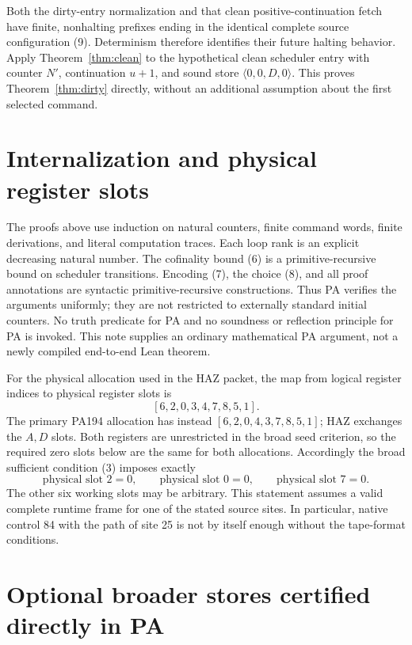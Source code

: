 \documentclass[11pt]{article}
\begin{document}
Both the dirty-entry normalization and that clean positive-continuation
fetch have finite, nonhalting prefixes ending in the identical complete
source configuration (9). Determinism therefore identifies their future
halting behavior. Apply Theorem~\ref{thm:clean} to the hypothetical clean
scheduler entry with counter $N'$, continuation $u+1$, and sound store
$\langle0,0,D,0\rangle$. This proves Theorem~\ref{thm:dirty} directly,
without an additional assumption about the first selected command.

\section{Internalization and physical register slots}

The proofs above use induction on natural counters, finite command words,
finite derivations, and literal computation traces. Each loop rank is an
explicit decreasing natural number. The cofinality bound (6) is a
primitive-recursive bound on scheduler transitions. Encoding (7), the
choice (8), and all proof annotations are syntactic primitive-recursive
constructions. Thus PA verifies the arguments uniformly; they are not
restricted to externally standard initial counters. No truth predicate
for PA and no soundness or reflection principle for PA is invoked.
This note supplies an ordinary mathematical PA argument, not a newly
compiled end-to-end Lean theorem.

For the physical allocation used in the HAZ packet, the map from logical
register indices to physical register slots is
\[
                    [6,2,0,3,4,7,8,5,1].
\]
The primary PA194 allocation has instead
$[6,2,0,4,3,7,8,5,1]$; HAZ exchanges the $A,D$ slots. Both registers
are unrestricted in the broad seed criterion, so the required zero
slots below are the same for both allocations.
Accordingly the broad sufficient condition (3) imposes exactly
\[
 \text{physical slot }2=0,\qquad
 \text{physical slot }0=0,\qquad
 \text{physical slot }7=0.
\]
The other six working slots may be arbitrary. This statement assumes a
valid complete runtime frame for one of the stated source sites. In
particular, native control 84 with the path of site 25 is not by itself
enough without the tape-format conditions.

\section{Optional broader stores certified directly in PA}
\end{document}
